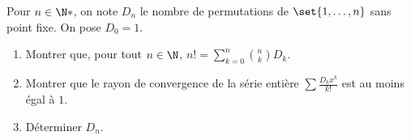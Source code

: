 \begin{enonce}
\begin{exercise}[ID={RMS127 E744},subtitle={Mines-Ponts PSI 2016},tags={}, difficulty={0}]
  Pour $n\in\N*$, on note $D_n$ le nombre de permutations de $\set{1,\dots,n}$ sans point fixe.
  On pose $D_0 = 1$.

  \begin{enumerate}
    \item 
      Montrer que, pour tout $n\in\N$, $n!= \sum_{k=0}^n \binom nk D_k$.

    \item 
      Montrer que le rayon de convergence de la série entière $\sum \frac{D_k x^k}{k!}$ est au moins égal à $1$.

    \item
      Déterminer $D_n$.
  \end{enumerate}
\end{exercise}
\begin{solution}
\end{solution}
\end{enonce}
